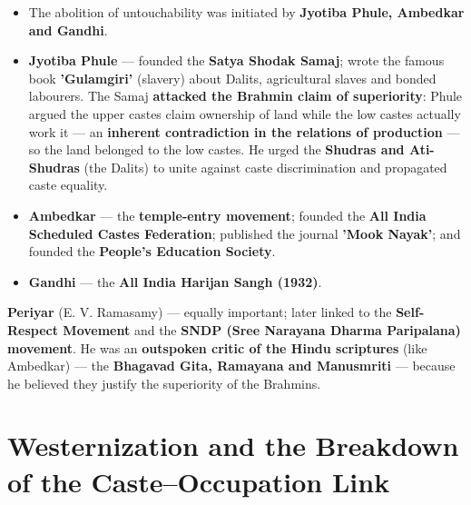 \begin{KeyConcept}
\begin{itemize}
\item The abolition of untouchability was initiated by \textbf{Jyotiba Phule, Ambedkar and Gandhi}.
\item \textbf{Jyotiba Phule} --- founded the \textbf{Satya Shodak Samaj}; wrote the famous book \textbf{'Gulamgiri'} (slavery) about Dalits, agricultural slaves and bonded labourers. The Samaj \textbf{attacked the Brahmin claim of superiority}: Phule argued the upper castes claim ownership of land while the low castes actually work it --- an \textbf{inherent contradiction in the relations of production} --- so the land belonged to the low castes. He urged the \textbf{Shudras and Ati-Shudras} (the Dalits) to unite against caste discrimination and propagated caste equality.
\item \textbf{Ambedkar} --- the \textbf{temple-entry movement}; founded the \textbf{All India Scheduled Castes Federation}; published the journal \textbf{'Mook Nayak'}; and founded the \textbf{People's Education Society}.
\item \textbf{Gandhi} --- the \textbf{All India Harijan Sangh (1932)}.
\end{itemize}
\end{KeyConcept}

\begin{KeyConcept}
\textbf{Periyar} (E. V. Ramasamy) --- equally important; later linked to the \textbf{Self-Respect Movement} and the \textbf{SNDP (Sree Narayana Dharma Paripalana) movement}. He was an \textbf{outspoken critic of the Hindu scriptures} (like Ambedkar) --- the \textbf{Bhagavad Gita, Ramayana and Manusmriti} --- because he believed they justify the superiority of the Brahmins.
\end{KeyConcept}

\section{Westernization and the Breakdown of the Caste--Occupation Link}

